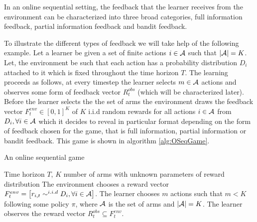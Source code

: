 In an online sequential setting, the feedback that the learner receives from the environment can be characterized into three broad categories, full information feedback, partial information feedback and bandit feedback. 


	To illustrate the different types of feedback we will take help of the following example. Let a learner be given a set of finite actions $i\in\mathcal{A}$ such that $|\mathcal{A}|=K$. Let, the environment be such that each action has a probability distribution $D_i$ attached to it which is fixed throughout the time horizon $T$. The learning proceeds as follows, at every timestep the learner selects $m\in\mathcal{A}$ actions and observes some form of feedback vector $R^{obs}_{t}$ (which will be characterized later). Before the learner selects the  the set of arms the environment draws the feedback vector $F^{env}_t\in[0,1]^{K}$ of $K$ i.i.d random rewards for all actions $i\in\mathcal{A}$ from $D_i,\forall i\in\mathcal{A}$ which it decides to reveal in particular format depending on the form of feedback chosen for the game, that is full information, partial information or bandit feedback. This game is shown in algorithm \ref{alg:OSeqGame}. 

\begin{algorithm}[!th]
\caption{An online sequential game}
\label{alg:OSeqGame}
\begin{algorithmic}
 Time horizon $T$, $K$ number of arms with unknown parameters of reward distribution
\State {}
\State The environment chooses a reward vector $F^{env}_{t}= \left[r_{i,t}\sim^{i.i.d} D_{i},\forall i\in\mathcal{A}\right]$.
\State The learner chooses $m$ actions such that $m < K$ following some policy $\pi$, where $\mathcal{A}$ is the set of arms and $|\mathcal{A}|=K$.
\State The learner observes the reward vector $R^{obs}_{t}\subseteq F^{env}_{t}$.
\State \EndFor
\end{algorithmic}
\end{algorithm}




